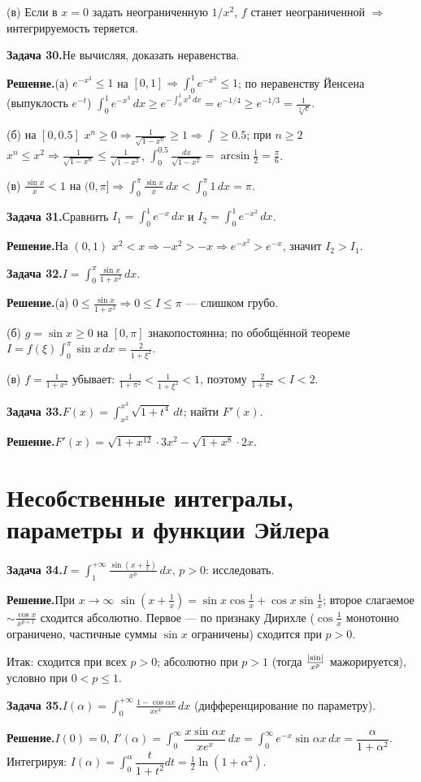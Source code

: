 \documentclass[10pt,a4paper]{article}
\newcommand{\dx}{\,dx}
\newcommand{\dt}{\,dt}
\renewcommand{\le}{\leqslant}
\renewcommand{\ge}{\geqslant}
\DeclarePairedDelimiter{\abs}{\lvert}{\rvert}
\theoremstyle{definition}
\theoremstyle{plain}
\newcommand{\writespace}{\vspace{7.5mm}}
\newcommand{\task}[2]{%
  \par\writespace\noindent
  \textbf{\textcolor{accent}{Задача #1.}}\enspace #2\par\smallskip}
\newcommand{\sol}{\par\noindent\textbf{Решение.}\enspace}
\begin{document}
(в) Если в $x=0$ задать неограниченную $1/x^2$, $f$ станет неограниченной
$\Rightarrow$ интегрируемость теряется.

\task{30}{Не вычисляя, доказать неравенства.}
\sol (а) $e^{-x^3}\le1$ на $[0,1]\Rightarrow\int_0^1 e^{-x^3}\le1$; по неравенству Йенсена (выпуклость
$e^{-t}$) $\int_0^1 e^{-x^3}\dx\ge e^{-\int_0^1 x^3\dx}=e^{-1/4}\ge e^{-1/3}=\tfrac1{\sqrt[3]e}$.

(б) на $[0,0.5]$ $x^n\ge0\Rightarrow\tfrac1{\sqrt{1-x^n}}\ge1\Rightarrow\int\ge0.5$; при $n\ge2$
$x^n\le x^2\Rightarrow\tfrac1{\sqrt{1-x^n}}\le\tfrac1{\sqrt{1-x^2}}$, $\int_0^{0.5}\tfrac{dx}{\sqrt{1-x^2}}=\arcsin\tfrac12=\tfrac\pi6$.

(в) $\tfrac{\sin x}{x}<1$ на $(0,\pi]\Rightarrow\int_0^\pi\tfrac{\sin x}x\dx<\int_0^\pi1\dx=\pi$.

\task{31}{Сравнить $I_1=\int_0^1 e^{-x}\dx$ и $I_2=\int_0^1 e^{-x^2}\dx$.}
\sol На $(0,1)$ $x^2<x\Rightarrow-x^2>-x\Rightarrow e^{-x^2}>e^{-x}$, значит $I_2>I_1$.

\task{32}{$\displaystyle I=\int_0^\pi\frac{\sin x}{1+x^2}\dx$.}
\sol (а) $0\le\tfrac{\sin x}{1+x^2}\Rightarrow 0\le I\le\pi$ — слишком грубо.

(б) $g=\sin x\ge0$ на
$[0,\pi]$ знакопостоянна; по обобщённой теореме $I=f(\xi)\int_0^\pi\sin x\dx=\tfrac{2}{1+\xi^2}$.

(в) $f=\tfrac1{1+x^2}$ убывает: $\tfrac1{1+\pi^2}<\tfrac1{1+\xi^2}<1$, поэтому
$\tfrac{2}{1+\pi^2}<I<2$.

\task{33}{$F(x)=\int_{x^2}^{x^3}\sqrt{1+t^4}\dt$; найти $F'(x)$.}
\sol $F'(x)=\sqrt{1+x^{12}}\cdot3x^2-\sqrt{1+x^8}\cdot2x$.

\section{Несобственные интегралы, параметры и функции Эйлера}

\task{34}{$\displaystyle I=\int_1^{+\infty}\frac{\sin(x+\frac1x)}{x^p}\dx$, $p>0$: исследовать.}
\sol При $x\to\infty$ $\sin(x+\tfrac1x)=\sin x\cos\tfrac1x+\cos x\sin\tfrac1x$; второе слагаемое
$\sim\tfrac{\cos x}{x^{p+1}}$ сходится абсолютно. Первое — по признаку Дирихле ($\cos\tfrac1x$
монотонно ограничено, частичные суммы $\sin x$ ограничены) сходится при $p>0$.

Итак: сходится при
всех $p>0$; абсолютно при $p>1$ (тогда $\tfrac{\abs{\sin}}{x^p}$ мажорируется), условно при
$0<p\le1$.

\task{35}{$\displaystyle I(\alpha)=\int_0^{+\infty}\frac{1-\cos\alpha x}{x e^x}\dx$ (дифференцирование по параметру).}
\sol $I(0)=0$, $I'(\alpha)=\int_0^\infty\dfrac{x\sin\alpha x}{x e^x}\dx=\int_0^\infty e^{-x}\sin\alpha x\dx
=\dfrac{\alpha}{1+\alpha^2}$. Интегрируя: $I(\alpha)=\int_0^\alpha\dfrac{t}{1+t^2}dt
=\tfrac12\ln(1+\alpha^2)$.
\end{document}
